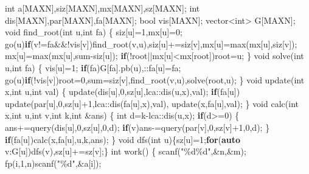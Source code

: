 \documentclass[
]{article}
\newenvironment{Shaded}{}{}
\newcommand{\ControlFlowTok}[1]{\textcolor[rgb]{0.00,0.44,0.13}{\textbf{#1}}}
\newcommand{\DataTypeTok}[1]{\textcolor[rgb]{0.56,0.13,0.00}{#1}}
\newcommand{\DecValTok}[1]{\textcolor[rgb]{0.25,0.63,0.44}{#1}}
\newcommand{\KeywordTok}[1]{\textcolor[rgb]{0.00,0.44,0.13}{\textbf{#1}}}
\newcommand{\NormalTok}[1]{#1}
\newcommand{\SpecialCharTok}[1]{\textcolor[rgb]{0.25,0.44,0.63}{#1}}
\newcommand{\StringTok}[1]{\textcolor[rgb]{0.25,0.44,0.63}{#1}}
\begin{document}
\begin{Shaded}
\begin{Highlighting}[]
\DataTypeTok{int}\NormalTok{ a[MAXN],siz[MAXN],mx[MAXN],sz[MAXN];}
\DataTypeTok{int}\NormalTok{ dis[MAXN],par[MAXN],fa[MAXN];}
\DataTypeTok{bool}\NormalTok{ vis[MAXN]; vector\textless{}}\DataTypeTok{int}\NormalTok{\textgreater{} G[MAXN];}
\DataTypeTok{void}\NormalTok{ find\_root(}\DataTypeTok{int}\NormalTok{ u,}\DataTypeTok{int}\NormalTok{ fa)}
\NormalTok{\{}
\NormalTok{    siz[u]=}\DecValTok{1}\NormalTok{,mx[u]=}\DecValTok{0}\NormalTok{;}
\NormalTok{    go(u)}\ControlFlowTok{if}\NormalTok{(v!=fa\&\&!vis[v])find\_root(v,u),siz[u]+=siz[v],mx[u]=max(mx[u],siz[v]);}
\NormalTok{    mx[u]=max(mx[u],sum{-}siz[u]);}
    \ControlFlowTok{if}\NormalTok{(!root||mx[u]\textless{}mx[root])root=u;}
\NormalTok{\}}
\DataTypeTok{void}\NormalTok{ solve(}\DataTypeTok{int}\NormalTok{ u,}\DataTypeTok{int}\NormalTok{ fa)}
\NormalTok{\{}
\NormalTok{    vis[u]=}\DecValTok{1}\NormalTok{; }\ControlFlowTok{if}\NormalTok{(fa)G[fa].pb(u),::fa[u]=fa;}
\NormalTok{    go(u)}\ControlFlowTok{if}\NormalTok{(!vis[v])root=}\DecValTok{0}\NormalTok{,sum=siz[v],find\_root(v,u),solve(root,u);}
\NormalTok{\}}
\DataTypeTok{void}\NormalTok{ update(}\DataTypeTok{int}\NormalTok{ x,}\DataTypeTok{int}\NormalTok{ u,}\DataTypeTok{int}\NormalTok{ val)}
\NormalTok{\{}
\NormalTok{    update(dis[u],}\DecValTok{0}\NormalTok{,sz[u],lca::dis(u,x),val);}
    \ControlFlowTok{if}\NormalTok{(fa[u])}
\NormalTok{        update(par[u],}\DecValTok{0}\NormalTok{,sz[u]+}\DecValTok{1}\NormalTok{,lca::dis(fa[u],x),val),}
\NormalTok{        update(x,fa[u],val);}
\NormalTok{\}}
\DataTypeTok{void}\NormalTok{ calc(}\DataTypeTok{int}\NormalTok{ x,}\DataTypeTok{int}\NormalTok{ u,}\DataTypeTok{int}\NormalTok{ v,}\DataTypeTok{int}\NormalTok{ k,}\DataTypeTok{int}\NormalTok{ \&ans)}
\NormalTok{\{}
    \DataTypeTok{int}\NormalTok{ d=k{-}lca::dis(u,x); }
    \ControlFlowTok{if}\NormalTok{(d\textgreater{}=}\DecValTok{0}\NormalTok{)}
\NormalTok{    \{}
\NormalTok{        ans+=query(dis[u],}\DecValTok{0}\NormalTok{,sz[u],}\DecValTok{0}\NormalTok{,d);}
        \ControlFlowTok{if}\NormalTok{(v)ans{-}=query(par[v],}\DecValTok{0}\NormalTok{,sz[v]+}\DecValTok{1}\NormalTok{,}\DecValTok{0}\NormalTok{,d);}
\NormalTok{    \}}
    \ControlFlowTok{if}\NormalTok{(fa[u])calc(x,fa[u],u,k,ans);}
\NormalTok{\}}
\DataTypeTok{void}\NormalTok{ dfs(}\DataTypeTok{int}\NormalTok{ u)\{sz[u]=}\DecValTok{1}\NormalTok{;}\ControlFlowTok{for}\NormalTok{(}\KeywordTok{auto}\NormalTok{ v:G[u])dfs(v),sz[u]+=sz[v];\}}
\DataTypeTok{int}\NormalTok{ work()}
\NormalTok{\{}
\NormalTok{    scanf(}\StringTok{"}\SpecialCharTok{\%d\%d}\StringTok{"}\NormalTok{,\&n,\&m);}
\NormalTok{    fp(i,}\DecValTok{1}\NormalTok{,n)scanf(}\StringTok{"}\SpecialCharTok{\%d}\StringTok{"}\NormalTok{,\&a[i]);}

\end{Highlighting}
\end{Shaded}
\end{document}
